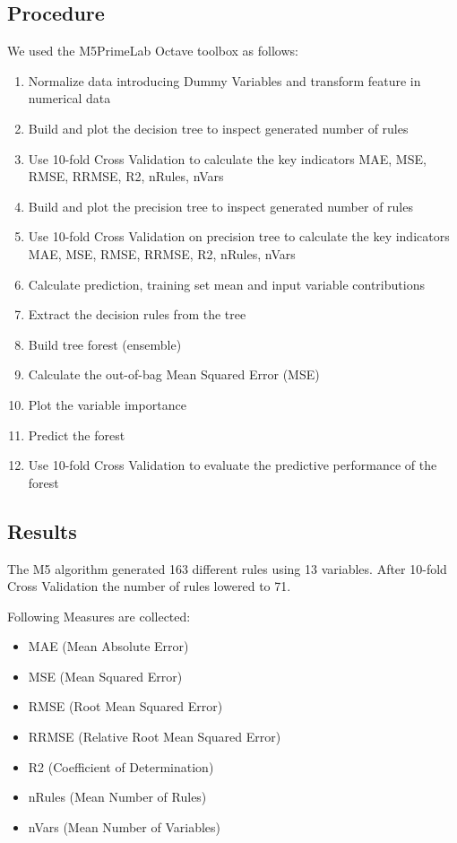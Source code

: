 \documentclass{article}
\begin{document}
\subsection{Procedure}
We used the M5PrimeLab Octave toolbox as follows:
\begin{enumerate}  
	\item Normalize data introducing Dummy Variables and transform feature in numerical data
	\item Build and plot the decision tree to inspect generated number of rules
	\item Use 10-fold Cross Validation to calculate the key indicators MAE, MSE, RMSE, RRMSE, R2, nRules, nVars
	\item Build and plot the precision tree to inspect generated number of rules
	\item Use 10-fold Cross Validation on precision tree to calculate the key indicators MAE, MSE, RMSE, RRMSE, R2, nRules, nVars
	\item Calculate prediction, training set mean and input variable contributions
	\item Extract the decision rules from the tree
	\item Build tree forest (ensemble) 
	\item Calculate the out-of-bag Mean Squared Error (MSE) 
	\item Plot the variable importance
	\item Predict the forest
	\item Use 10-fold Cross Validation to evaluate the predictive performance of the forest
\end{enumerate}

\subsection{Results}
The M5 algorithm generated 163 different rules using 13 variables.
\break \bigskip After 10-fold Cross Validation the number of rules lowered to 71.

\bigskip
Following Measures are collected:
\begin{itemize}
	\item MAE (Mean Absolute Error)
	\item MSE (Mean Squared Error)
	\item RMSE (Root Mean Squared Error)
	\item RRMSE (Relative Root Mean Squared Error)
	\item R2 (Coefficient of Determination)
	\item nRules (Mean Number of Rules)
	\item nVars (Mean Number of Variables)
\end{itemize}
\end{document}
